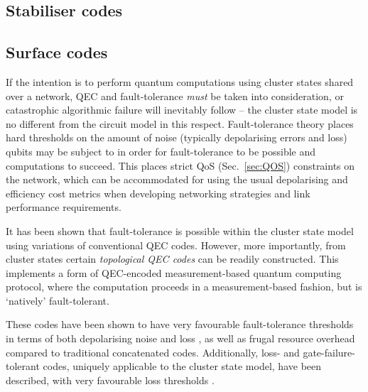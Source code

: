 %
%

\subsection{Stabiliser codes}\label{sec:stab_code}


%
%

\subsection{Surface codes}\label{sec:surface_codes}


If the intention is to perform quantum computations using cluster states shared over a network, QEC and fault-tolerance \textit{must} be taken into consideration, or catastrophic algorithmic failure will inevitably follow -- the cluster state model is no different from the circuit model in this respect. Fault-tolerance theory places hard thresholds on the amount of noise (typically depolarising errors and loss) qubits may be subject to in order for fault-tolerance to be possible and computations to succeed. This places strict QoS (Sec.~\ref{sec:QOS}) constraints on the network, which can be accommodated for using the usual depolarising and efficiency cost metrics when developing networking strategies and link performance requirements.

It has been shown that fault-tolerance is possible within the cluster state model \cite{bib:NielsenDawson04, bib:Dawson06} using variations of conventional QEC codes. However, more importantly, from cluster states certain \textit{topological QEC codes} \cite{???} can be readily constructed. This implements a form of QEC-encoded measurement-based quantum computing protocol, where the computation proceeds in a measurement-based fashion, but is `natively' fault-tolerant.

These codes have been shown to have very favourable fault-tolerance thresholds in terms of both depolarising noise and loss \cite{bib:StaceBarrettDohertyLoss, bib:BarrettStaceFT}, as well as frugal resource overhead compared to traditional concatenated codes. Additionally, loss- and gate-failure-tolerant codes, uniquely applicable to the cluster state model, have been described, with very favourable loss thresholds \cite{bib:Varnava05, bib:RalphHayes05, bib:Duan05}. 

